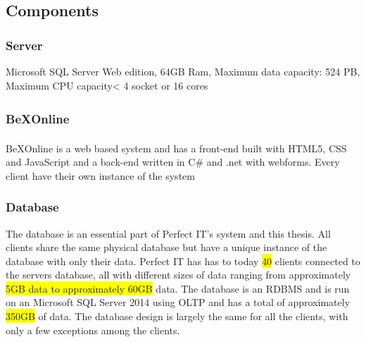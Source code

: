 \documentclass{cslthse-msc}
\newcommand{\hilight}[1]{\colorbox{yellow}{#1}}
\newcommand{\bex}{BeX\textsuperscript{\textregistered}}
\begin{document}
\subsection{Components}


\subsubsection{Server}
Microsoft SQL Server Web edition, 64GB Ram, Maximum data capacity: 524 PB, Maximum CPU capacity< 4 socket or 16 cores 

\subsubsection{\bex Online}
\bex Online is a web based system and has a front-end built with HTML5, CSS and JavaScript and a back-end written in C\# and .net with webforms.
Every client have their own instance of the system 

\subsubsection{Database}
The database is an essential part of Perfect IT's system and this thesis. All clients share the same physical database but have a unique instance of the database with only their data.  Perfect IT has has to today \hilight{40} clients connected to the servers database, all with different sizes of data ranging from approximately \hilight{5GB data to approximately 60GB} data. The database is an RDBMS and is run on an Microsoft SQL Server 2014 using OLTP and has a total of approximately \hilight{350GB} of data. The database design is largely the same for all the clients, with only a few exceptions among the clients.\\\\ 
\end{document}

